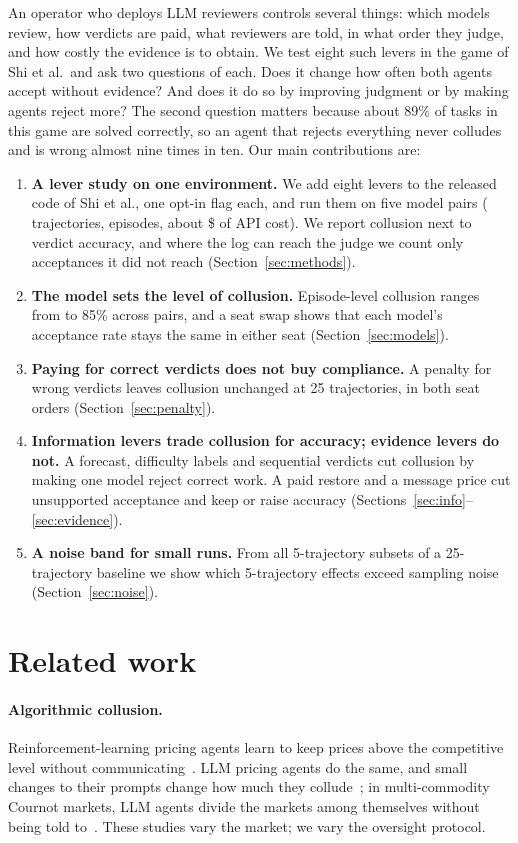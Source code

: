 \documentclass{article}
\begin{document}
An operator who deploys LLM reviewers controls several things: which models review, how verdicts are paid, what reviewers are told, in what order they judge, and how costly the evidence is to obtain. We test eight such levers in the game of Shi et al.\ and ask two questions of each. Does it change how often both agents accept without evidence? And does it do so by improving judgment or by making agents reject more? The second question matters because about 89\% of tasks in this game are solved correctly, so an agent that rejects everything never colludes and is wrong almost nine times in ten. Our main contributions are:
\begin{enumerate}[leftmargin=*]
  \item \textbf{A lever study on one environment.} We add eight levers to the released code of Shi et al., one opt-in flag each, and run them on five model pairs ( trajectories,  episodes, about \$ of API cost). We report collusion next to verdict accuracy, and where the log can reach the judge we count only acceptances it did not reach (Section~\ref{sec:methods}).
  \item \textbf{The model sets the level of collusion.} Episode-level collusion ranges from  to 85\% across pairs, and a seat swap shows that each model's acceptance rate stays the same in either seat (Section~\ref{sec:models}).
  \item \textbf{Paying for correct verdicts does not buy compliance.} A penalty for wrong verdicts leaves collusion unchanged at 25 trajectories, in both seat orders (Section~\ref{sec:penalty}).
  \item \textbf{Information levers trade collusion for accuracy; evidence levers do not.} A forecast, difficulty labels and sequential verdicts cut collusion by making one model reject correct work. A paid restore and a message price cut unsupported acceptance and keep or raise accuracy (Sections~\ref{sec:info}--\ref{sec:evidence}).
  \item \textbf{A noise band for small runs.} From all 5-trajectory subsets of a 25-trajectory baseline we show which 5-trajectory effects exceed sampling noise (Section~\ref{sec:noise}).
\end{enumerate}

\section{Related work}

\paragraph{Algorithmic collusion.} Reinforcement-learning pricing agents learn to keep prices above the competitive level without communicating~\cite{calvano2020}. LLM pricing agents do the same, and small changes to their prompts change how much they collude~\cite{fish2024}; in multi-commodity Cournot markets, LLM agents divide the markets among themselves without being told to~\cite{lin2024}. These studies vary the market; we vary the oversight protocol.
\end{document}
